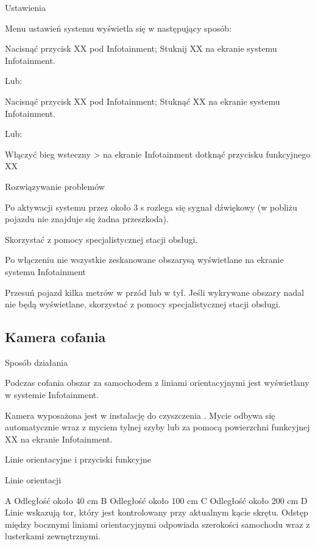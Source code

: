 Ustawienia

Menu ustawień systemu wyświetla się w następujący sposób:
\begin{itemizeArrow}
	\itemArrow Nacisnąć przycisk XX pod Infotainment; Stuknij XX na ekranie systemu Infotainment.
\end{itemizeArrow}
Lub:
\begin{itemizeArrow}
	\itemArrow Nacisnąć przycisk XX pod Infotainment; Stuknąć XX na ekranie systemu Infotainment.
\end{itemizeArrow}
Lub:
\begin{itemizeArrow}
	\itemArrow Włączyć bieg wsteczny > na ekranie Infotainment dotknąć przycisku funkcyjnego XX
\end{itemizeArrow}

Rozwiązywanie problemów

Po aktywacji systemu przez około 3 s rozlega się sygnał dźwiękowy (w pobliżu pojazdu nie znajduje się żadna przeszkoda).
\begin{itemizeArrow}
	\itemArrow Skorzystać z pomocy specjalistycznej stacji obsługi.
\end{itemizeArrow}

Po włączeniu nie wszystkie zeskanowane obszarysą wyświetlane na ekranie systemu Infotainment 
\begin{itemizeArrow}
	\itemArrow Przesuń pojazd kilka metrów w przód lub w tył.
	\itemArrow Jeśli wykrywane obszary nadal nie będą wyświetlane, skorzystać z pomocy specjalistycznej stacji obsługi.
\end{itemizeArrow}

\subsection{Kamera cofania}

Sposób działania

Podczas cofania obszar za samochodem z liniami orientacyjnymi jest wyświetlany w systemie Infotainment.

Kamera wyposażona jest w instalację do czyszczenia . Mycie odbywa się automatycznie wraz z myciem tylnej szyby lub za pomocą powierzchni funkcyjnej XX na ekranie Infotainment.

Linie orientacyjne i przyciski funkcyjne

Linie orientacji

A Odległość około 40 cm
B Odległość około 100 cm
C Odległość około 200 cm
D Linie wskazują tor, który jest kontrolowany przy aktualnym kącie skrętu. Odstęp między bocznymi liniami orientacyjnymi odpowiada szerokości samochodu wraz z lusterkami zewnętrznymi.

